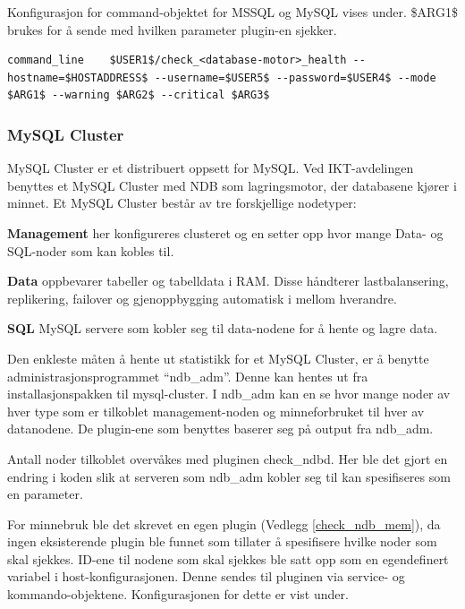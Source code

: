 Konfigurasjon for command-objektet for MSSQL og MySQL vises under. \$ARG1\$ brukes for å sende med hvilken parameter plugin-en sjekker.
\begin{lstlisting}[style=example]
    command_line	$USER1$/check_<database-motor>_health --hostname=$HOSTADDRESS$ --username=$USER5$ --password=$USER4$ --mode $ARG1$ --warning $ARG2$ --critical $ARG3$
\end{lstlisting}

\subsubsection{MySQL Cluster}
MySQL Cluster er et distribuert oppsett for MySQL. Ved IKT-avdelingen benyttes et MySQL Cluster med NDB som lagringsmotor, der databasene kjører i minnet. Et MySQL Cluster består av tre forskjellige nodetyper\cite{ndbinformation}:
\begin{itemize*}
	\item \textbf{Management} her konfigureres clusteret og en setter opp hvor mange Data- og SQL-noder som kan kobles til.
	\item \textbf{Data} oppbevarer tabeller og tabelldata i RAM. Disse håndterer lastbalansering, replikering, failover og gjenoppbygging automatisk i mellom hverandre.
	\item \textbf{SQL} MySQL servere som kobler seg til data-nodene for å hente og lagre data.
\end{itemize*}

Den enkleste måten å hente ut statistikk for et MySQL Cluster, er å benytte administrasjonsprogrammet ``ndb\_adm''. Denne kan hentes ut fra installasjonspakken til mysql-cluster\cite{ndbdownload}. I ndb\_adm kan en se hvor mange noder av hver type som er tilkoblet management-noden og minneforbruket til hver av datanodene. De plugin-ene som benyttes baserer seg på output fra ndb\_adm.

Antall noder tilkoblet overvåkes med pluginen check\_ndbd\cite{ndbnode}. Her ble det gjort en endring i koden slik at serveren som ndb\_adm kobler seg til kan spesifiseres som en parameter.

For minnebruk ble det skrevet en egen plugin (Vedlegg \ref{check_ndb_mem}), da ingen eksisterende plugin ble funnet som tillater å spesifisere hvilke noder som skal sjekkes. ID-ene til nodene som skal sjekkes ble satt opp som en egendefinert variabel i host-konfigurasjonen. Denne sendes til pluginen via service- og kommando-objektene. Konfigurasjonen for dette er vist under.

